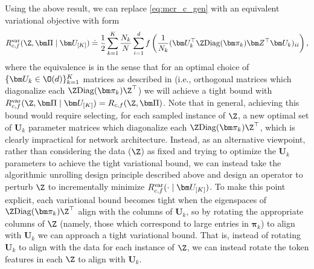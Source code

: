 \documentclass[../../book-main.tex]{subfiles}
\begin{document}
Using the above result, we can replace \eqref{eq:mcr_c_gen} with an
equivalent variational objective with form
\begin{equation}
    \label{eq:var_comp}
    R^{\rm var}_{c,f} (\Z,\bm \Pi \mid \bm U_{[K]}) \doteq
    \frac{1}{2}\sum_{k=1}^K \frac{N_k}{N} \sum_{i=1}^{d}
    f\left(\frac{1}{N_k} (\bm U_{k}^{\top} \Z \mathrm{Diag}(\bm
    \pi_k) \bm Z^{\top} \bm U_{k})_{ii} \right),
\end{equation}
where the equivalence is in the sense that for an optimal choice of
$\{ \bm U_k \in \O(d)\}_{k=1}^K$ matrices as described in
 (i.e., orthogonal matrices which diagonalize
each $\Z \mathrm{Diag}(\bm \pi_k) \Z^\top $) we will achieve a tight
bound with $ R^{\rm var}_{c,f} (\Z,\bm \Pi \mid \bm U_{[K]}) =
R_{c,f} (\Z,\bm \Pi)$. Note that in general, achieving this bound
would require selecting, for each sampled instance of $\Z$, a new
optimal set of $\bm U_{k}$ parameter matrices which diagonalize each
$\Z\mathrm{Diag}(\bm \pi_{k})\Z^{\top}$, which is clearly impractical
for network architecture.
Instead, as an alternative viewpoint, rather than considering the
data ($\Z$) as fixed and trying to optimize the $\bm U_k$ parameters
to achieve the tight variational bound, we can instead take the
algorithmic unrolling design principle described above and design an
operator to perturb $\Z$ to incrementally minimize $R_{c, f}^{\rm
var}(\cdot \mid \bm U_{[K]})$.  To make this point explicit, each
variational bound becomes tight when the eigenspaces of $\Z
\mathrm{Diag}(\bm \pi_k) \Z
^\top$ align with the columns of $\bm U_k$, so by rotating the
appropriate columns of $\Z$ (namely, those which correspond to large
entries in $\bm \pi_k$) to align with $\bm U_k$ we can approach a
tight variational bound. That is, instead of rotating $\bm U_k$ to
align with the data for each instance of $\Z$, we can instead rotate
the token features in each $\Z$ to align with $\bm U_k$.
\end{document}
